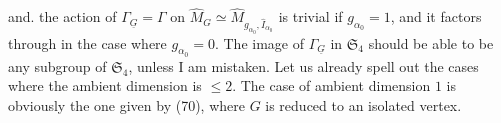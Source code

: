  and. the action of $\Gamma_{\underline G}=\Gamma$ on $\widehat M_G\simeq\widehat M_{g_{\alpha_0},\widehat I_{\alpha_0}}$ is trivial if $g_{\alpha_0}=1$, and it factors through
in the case where $g_{\alpha_0}=0$. The image of $\Gamma_{\underline G}$ in $\mathfrak S_4$ should be able to be any subgroup of $\mathfrak S_4$, unless I am mistaken. Let us already spell out the cases where the ambient dimension is $\leq2$. The case of ambient dimension $1$  is obviously the one given by (70), where $G$ is reduced to an isolated vertex.

